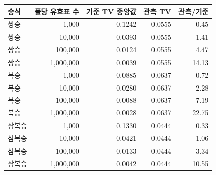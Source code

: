 \begin{tabular}{lrrrr}
\toprule
승식 & 풀당 유효표 수 & 기준 TV 중앙값 & 관측 TV & 관측/기준 \\
\midrule
쌍승 & 1,000 & 0.1242 & 0.0555 & 0.45 \\
쌍승 & 10,000 & 0.0393 & 0.0555 & 1.41 \\
쌍승 & 100,000 & 0.0124 & 0.0555 & 4.47 \\
쌍승 & 1,000,000 & 0.0039 & 0.0555 & 14.13 \\
복승 & 1,000 & 0.0885 & 0.0637 & 0.72 \\
복승 & 10,000 & 0.0280 & 0.0637 & 2.28 \\
복승 & 100,000 & 0.0088 & 0.0637 & 7.19 \\
복승 & 1,000,000 & 0.0028 & 0.0637 & 22.75 \\
삼복승 & 1,000 & 0.1330 & 0.0444 & 0.33 \\
삼복승 & 10,000 & 0.0421 & 0.0444 & 1.06 \\
삼복승 & 100,000 & 0.0133 & 0.0444 & 3.34 \\
삼복승 & 1,000,000 & 0.0042 & 0.0444 & 10.55 \\
\bottomrule
\end{tabular}
